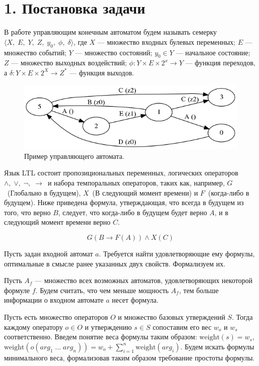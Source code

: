 \documentclass[12pt,fleqn]{article}
\begin{document}
\section{1. Постановка задачи}

В работе управляющим конечным автоматом будем называть семерку $\langle X,\; E,\; Y,\; Z,\; y_0,\; \phi,\; \delta \rangle$,
где $X$ --- множество входных булевых переменных; $E$ --- множество событий; $Y$ --- множество состояний;
$y_0 \in Y$ --- начальное состояние; $Z$ --- множество выходных воздействий;
$\phi : Y \times E \times 2^x \rightarrow Y$ --- функция переходов, а
$\delta : Y \times E \times 2^X \rightarrow Z^*$ --- функция выходов.

\begin{figure}[!hb]
  \centering
    \includegraphics[scale=0.5]{lift.png}
  \caption{Пример управляющего автомата.}
\end{figure}

Язык LTL состоит пропозициональных переменных, логических операторов $\wedge,\; \vee,\; \lnot,\; \rightarrow$\ и набора
темпоральных операторов, таких как, например, $G$\ (Глобально в будущем), $X$\ (В следующий момент времени) и
$F$\ (когда-либо в будущем). Ниже приведена формула, утверждающая, что всегда в будущем из того, что верно $B$, следует,
что когда-либо в будущем будет верно $A$, и в следующий момент времени верно $C$.

$$
G(B \rightarrow F(A)) \wedge X(C)
$$

Пусть задан входной автомат $a$. Требуется найти удовлетворяющие ему формулы, оптимальные в смысле ранее указанных
двух свойств. Формализуем их.

Пусть $A_f$ --- множество всех возможных автоматов, удовлетворяющих некоторой формуле $f$. Будем считать,
что чем меньше мощность $A_f$, тем больше информации о входном автомате $a$ несет формула.

Пусть есть множество операторов $O$ и множество базовых утверждений $S$.
Тогда каждому оператору $o \in O$ и утверждению $s \in S$ сопоставим его вес $w_o$ и $w_s$ соответственно.
Введем понятие веса формулы таким образом: $\text{weight}(s) = w_s$, $\text{weight}(o(arg_1\; \ldots \; arg_n)) = w_o + \sum_{i=1}^{n}\text{weight}(arg_i)$.
Будем искать формулы минимального веса, формализовав таким образом требование простоты формулы.
\end{document}
